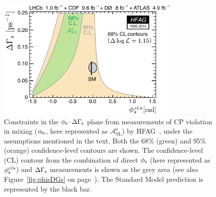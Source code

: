 \begin{figure}[tb]
  \centering
  \includegraphics[width=0.8\textwidth]{graphics/pheno/hfag_PDG2014_DGsphis_asls-crop-cmyk}
  \caption{Constraints in the $\phi_\text{s}$--$\Delta\Gamma_\text{s}$ plane from measurements of CP violation in mixing ($a_\text{fs}$, here represented as
	   $\mathcal{A}_\text{SL}^\text{s}$) by HFAG~\cite{Amhis:2012bh}, under the assumptions mentioned in the text.
           Both the 68\% (green) and 95\% (orange) confidence-level contours are shown.
           The confidence-level (CL) contour from the combination of direct $\phi_\text{s}$ (here represented as $\phisccs$) and $\Delta\Gamma_\text{s}$
           measurements is shown as the grey area (see also Figure~\ref{fig:phisDGs} on page~\pageref{fig:phisDGs}).
           The Standard Model prediction is represented by the black bar.}
  \label{fig:phisDGs_asls}
\end{figure}
